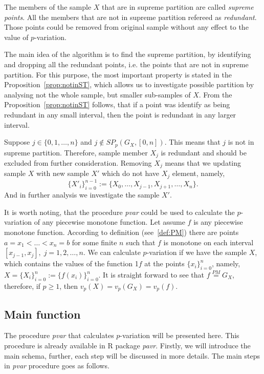 \documentclass[12pt, a4paper]{article}
\numberwithin{equation}{section}
\begin{document}
The members of the sample $X$ that are in supreme partition are
called \emph{supreme points}. All the members
that are not in supreme partition refereed as
\emph{redundant}. Those points could be removed from original sample without any effect to 
the value of $p$-variation.

The main idea of the algorithm is to find the supreme
partition, by identifying and dropping all the redundant
points, i.e. the points that are not in supreme partition.
For this purpose, the most important property is
stated in the Proposition~\ref{prop:notinST},
which allows us to investigate possible 
partition by analysing not the whole sample, but
smaller sub-samples of $X$. From the
Proposition~\ref{prop:notinST} follows, that 
if a point was identify as being redundant in any
small interval, then the point is redundant in
any larger interval. 

Suppose $j \in \{0, 1, \dots, n\}$ and
$j \notin SP_p(G_X, [0, n])$. This means that
$j$ is not in supreme partition. Therefore, 
sample member $X_j$ is redundant and should be excluded from further consideration.
Removing $X_j$ means that we 
updating sample $X$ with new sample $X'$ which do not have
$X_j$ element, namely,  
$$
\{X'_{i}\}_{i=0}^{n-1}:=\{X_0,\dots,X_{j-1},X_{j+1},\dots,X_n\}.
$$
And in further analysis we investigate the sample $X'$. 

It is worth noting, 
that the procedure \emph{pvar} could be used to calculate
the $p$-variation of any piecewise monotone function.
Let assume $f$ is any piecewise monotone function.  
According to definition (see~\ref{def:PM}) 
there are points $a=x_1<\dots<x_n=b$ for some finite $n$ such 
that $f$ is monotone on each interval 
$[x_{j-1},x_j],\;j=1,2,\dots,n$.
We can calculate $p$-variation if we have the sample $X$, 
which contains the values of the function 1$f$ 
at the points $\{x_{i}\}_{i=0}^{n}$, namely,
$X=\{X_{i}\}_{i=0}^{n}:=\{f(x_{i})\}_{i=0}^{n}$.
It is straight forward to see that 
$f \stackrel{PM}{=} G_X$, 
therefore, if $p \geq 1$, then $v_p(X)=v_p(G_X)=v_p(f)$.


\subsection{Main function}
\label{sub:MainFunction}

The procedure \emph{pvar} that calculates
$p$-variation will be presented here. This procedure
is already available in R package \emph{pavr}. Firstly,
we will introduce the main schema, further, each step will
be discussed in more details. 
The main steps in \emph{pvar} procedure
goes as follows.
\end{document}
